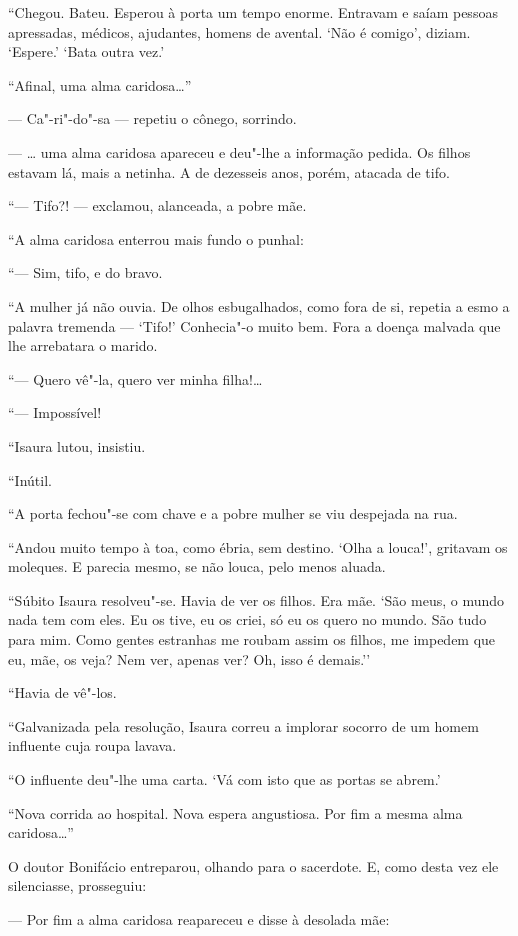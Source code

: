 ``Chegou. Bateu. Esperou à porta um tempo enorme. Entravam e saíam
pessoas apressadas, médicos, ajudantes, homens de avental. `Não é
comigo', diziam. `Espere.' `Bata outra vez.'

``Afinal, uma alma caridosa\ldots{}''

--- Ca"-ri"-do"-sa --- repetiu o cônego, sorrindo.

--- \ldots{} uma alma caridosa apareceu e deu"-lhe a informação pedida. Os
filhos estavam lá, mais a netinha. A de dezesseis anos, porém, atacada
de tifo.

``--- Tifo?! --- exclamou, alanceada, a pobre mãe.

``A alma caridosa enterrou mais fundo o punhal:

``--- Sim, tifo, e do bravo.

``A mulher já não ouvia. De olhos esbugalhados, como fora de si, repetia
a esmo a palavra tremenda --- `Tifo!' Conhecia"-o muito bem. Fora a
doença malvada que lhe arrebatara o marido.

``--- Quero vê"-la, quero ver minha filha!\ldots{}

``--- Impossível!

``Isaura lutou, insistiu.

``Inútil.

``A porta fechou"-se com chave e a pobre mulher se viu despejada na rua.

``Andou muito tempo à toa, como ébria, sem destino. `Olha a louca!',
gritavam os moleques. E parecia mesmo, se não louca, pelo menos aluada.

``Súbito Isaura resolveu"-se. Havia de ver os filhos. Era mãe. `São meus,
o mundo nada tem com eles. Eu os tive, eu os criei, só eu os quero no
mundo. São tudo para mim. Como gentes estranhas me roubam assim os
filhos, me impedem que eu, mãe, os veja? Nem ver, apenas ver? Oh, isso é
demais.''

``Havia de vê"-los.

``Galvanizada pela resolução, Isaura correu a implorar socorro de um
homem influente cuja roupa lavava.

``O influente deu"-lhe uma carta. `Vá com isto que as portas se abrem.'

``Nova corrida ao hospital. Nova espera angustiosa. Por fim a mesma alma
caridosa\ldots{}''

O doutor Bonifácio entreparou, olhando para o sacerdote. E, como desta
vez ele silenciasse, prosseguiu:

--- Por fim a alma caridosa reapareceu e disse à desolada mãe:

